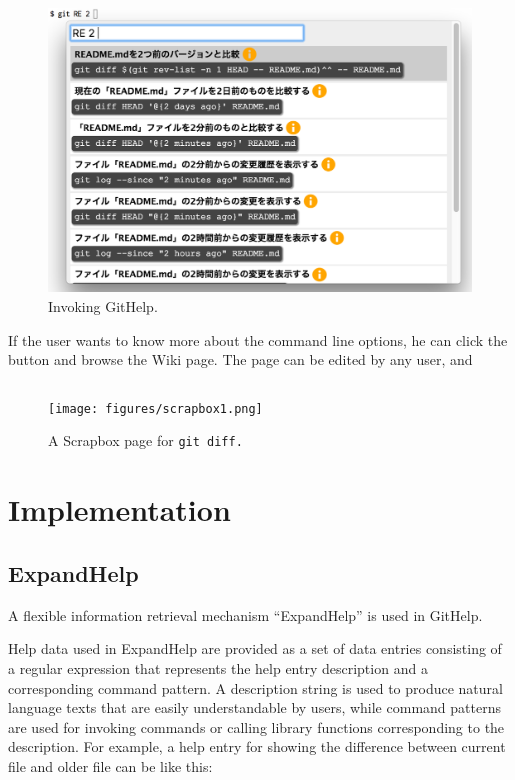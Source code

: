 \documentclass{sigchi}
\def\GH{\textsf{GitHelp}}
\def\SB{\textsf{Scrapbox}}
\def\EH{\textsf{ExpandHelp}}
\begin{document}
\begin{figure}[H]
  \includegraphics[width=12cm,bb=-100 -100 1190 766]{figures/githelp1.png}
  \caption{Invoking {\GH}.}
  \label{bash2}
\end{figure}

If the user wants to know more about the command line options,
he can click the
button and browse the Wiki page.
The page can be edited by any user, and 

\begin{figure}[htb]
\begin{verbatim}
\end{verbatim}
\centerline{\texttt{[image: figures/scrapbox1.png]}}
\caption{A {\SB} page for \tt{git diff}.}
\label{scrapboxpage}
\end{figure}

\section{Implementation}


\subsection{ExpandHelp}

A flexible information retrieval mechanism ``{\EH}'' is used in {\GH}.

Help data used in {\EH} are provided as a set of data entries
consisting of a regular expression that represents the help entry description
and a corresponding command pattern.
A description string is used to produce natural language texts
that are easily understandable by users,
while command patterns are used for invoking commands or calling library functions
corresponding to the description.
%
For example, a help entry for showing the difference between
current file and older file can be like this:
\end{document}
